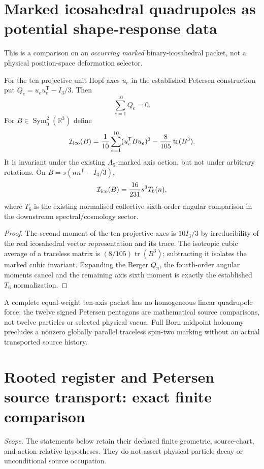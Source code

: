 \documentclass[11pt]{article}
\begin{document}
\section{Marked icosahedral quadrupoles as potential shape-response data}
\label{bh:berger:v117:p1b:quadrupoles}
This is a comparison on an \emph{occurring marked} binary-icosahedral
packet, not a physical position-space deformation selector.
\begin{proposition}
\label{bh:berger:v117:p1b:cubic}
For the ten projective unit Hopf axes $u_e$ in the established
Petersen construction put $Q_e=u_eu_e^{\mathsf T}-I_3/3$. Then
\[
 \sum_{e=1}^{10}Q_e=0.
\]
For $B\in\operatorname{Sym}^2_0(\mathbb R^3)$ define
\[
 \mathcal I_{\rm ico}(B)=\frac1{10}\sum_{e=1}^{10}
                 (u_e^{\mathsf T}Bu_e)^3
                -\frac8{105}\operatorname{tr}(B^3).
\]
It is invariant under the existing $A_5$-marked axis action, but
not under arbitrary rotations. On $B=s(nn^{\mathsf T}-I_3/3)$,
\[
 \mathcal I_{\rm ico}(B)=\frac{16}{231}s^3T_6(n),
\]
where $T_6$ is the existing normalised collective sixth-order
angular comparison in the downstream spectral/cosmology sector.
\end{proposition}
\begin{proof}
The second moment of the ten projective axes is $10I_3/3$ by
irreducibility of the real icosahedral vector representation and its
trace.  The isotropic cubic average of a traceless matrix is
$(8/105)\operatorname{tr}(B^3)$; subtracting it isolates the marked
cubic invariant.  Expanding the Berger $Q_n$, the fourth-order
angular moments cancel and the remaining axis sixth moment is
exactly the established $T_6$ normalization.
\end{proof}
\begin{remark}
\label{bh:berger:v117:p1b:scope}
A complete equal-weight ten-axis packet has no homogeneous linear
quadrupole force; the twelve signed Petersen pentagons are mathematical
source comparisons, not twelve particles or selected physical vacua.
Full Born midpoint holonomy precludes a nonzero globally parallel
traceless spin-two marking without an actual transported source history.
\end{remark}




\section{Rooted register and Petersen source transport: exact finite comparison}
\noindent\emph{Scope.} The statements below retain their declared finite geometric, source-chart, and action-relative hypotheses. They do not assert physical particle decay or unconditional source occupation.
\end{document}
